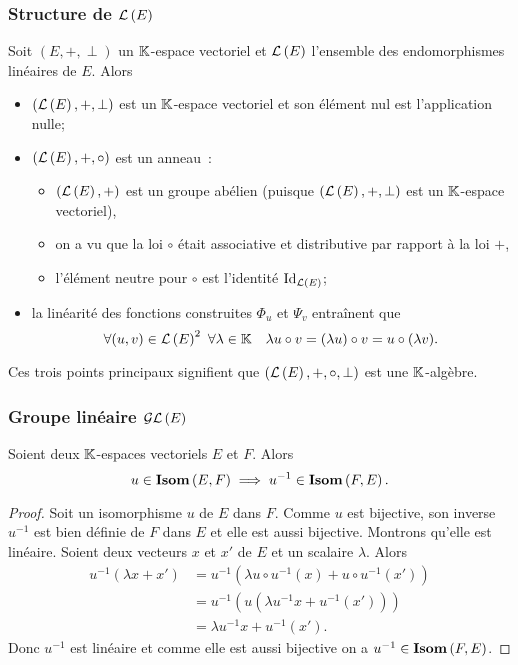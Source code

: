 \subsubsection{Structure de \(\mathcal{L}\left(E\right)\)}

Soit \((E,+,\perp)\) un \(\mathbb{K}\)-espace vectoriel et \(\mathcal{L}\left(E\right)\) l'ensemble des
endomorphismes linéaires de \(E\). Alors
\begin{itemize}
  \item \((\mathcal{L}\left(E\right),+,\perp)\) est un \(\mathbb{K}\)-espace vectoriel et son élément nul
    est l'application nulle;
  \item \((\mathcal{L}\left(E\right), +, \circ)\) est un anneau~:
    \begin{itemize}
      \item \((\mathcal{L}\left(E\right),+)\) est un groupe abélien (puisque
        \((\mathcal{L}\left(E\right),+,\perp)\) est un \(\mathbb{K}\)-espace vectoriel),
      \item on a vu que la loi \(\circ\) était associative et distributive par
        rapport à la loi \(+\),
      \item l'élément neutre pour \(\circ\) est l'identité \(\operatorname{Id}_{\mathcal{L}\left(E\right)}\);
    \end{itemize}
  \item la linéarité des fonctions construites \(\Phi_u\) et \(\Psi_v\)
    entraînent que
    \begin{equation}
      \forall (u,v) \in \mathcal{L}\left(E\right)^2 \ \forall \lambda \in \mathbb{K} \quad \lambda u
      \circ v = (\lambda u) \circ v = u \circ (\lambda v).
    \end{equation}
\end{itemize}

Ces trois points principaux signifient que \((\mathcal{L}\left(E\right), +, \circ, \perp)\) est
une \(\mathbb{K}\)-algèbre.

\subsubsection{Groupe linéaire \(\mathcal{GL}\left(E\right)\)}

\begin{theo}
  Soient deux \(\mathbb{K}\)-espaces vectoriels \(E\) et \(F\). Alors
  \begin{equation}
    u \in \mathbf{Isom}\left(E,F\right) \implies u^{-1} \in \mathbf{Isom}\left(F,E\right).
  \end{equation}
\end{theo}
\begin{proof}
  Soit un isomorphisme \(u\) de \(E\) dans \(F\). Comme \(u\) est bijective, son
  inverse \(u^{-1}\) est bien définie de \(F\) dans \(E\) et elle est aussi
  bijective. Montrons qu'elle est linéaire. Soient deux vecteurs \(x\) et \(x'\)
  de \(E\) et un scalaire \(\lambda\). Alors
  \begin{align}
    u^{-1}(\lambda x+x') &= u^{-1}(\lambda u\circ u^{-1} (x) + u \circ
    u^{-1}(x')) \\
    &=u^{-1}(u(\lambda u^{-1} x +u^{-1}(x'))) \\
    &=\lambda u^{-1} x +u^{-1}(x').
  \end{align}
  Donc \(u^{-1}\) est linéaire et comme elle est aussi bijective on a \(u^{-1}
  \in \mathbf{Isom}\left(F,E\right)\).
\end{proof}

